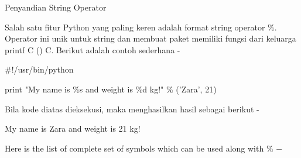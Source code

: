 \documentclass[a4paper,12pt]{report}
\begin{document}


\vspace{12pt}
\noindent 
Penyandian String Operator \par
\vspace{12pt}
\noindent 
Salah satu fitur Python yang paling keren adalah format string operator $  \%  $. Operator ini unik untuk string dan membuat paket memiliki fungsi dari keluarga printf C () C. Berikut adalah contoh sederhana - \par
\noindent 
\vspace{12pt}
\noindent 
 $  \#  $!/usr/bin/python \par
\noindent 
\vspace{12pt}
\noindent 
print "My name is  $  \%  $s and weight is  $  \%  $d kg!"  $  \%  $ ('Zara', 21)  \par
\vspace{12pt}
\noindent 
Bila kode diatas dieksekusi, maka menghasilkan hasil sebagai berikut - \par
\noindent 
\vspace{12pt}
\noindent 
My name is Zara and weight is 21 kg! \par
\noindent 
Here is the list of complete set of symbols which can be used along with  $  \%  $  $ - $ \par


\end{document}
